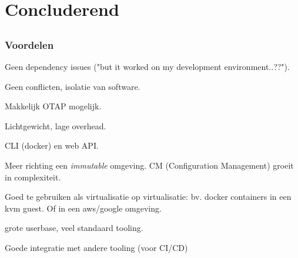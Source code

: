 \section{Concluderend}
\subsection{}
\begin{styleframe}
    \frametitle{Voordelen}
\scriptsize
\begin{description}[plus]
    \item[+] Geen dependency issues ("but it worked on my development environment..??").
    \pause
    \item[+] Geen conflicten, isolatie van software.
    \pause
    \item[+] Makkelijk OTAP mogelijk.
    \pause
    \item[+] Lichtgewicht, lage overhead.
    \pause
    \item[+] CLI (docker) en web API.
    \pause
    \item[+] Meer richting een {\it immutable} omgeving. CM (Configuration Management) groeit in complexiteit.
    \pause
    \item[+] Goed te gebruiken als virtualisatie op virtualisatie: bv. docker containers in een kvm guest. Of in een aws/google omgeving.
    \pause
    \item[+] grote userbase, veel standaard tooling.
    \pause
    \item[+] Goede integratie met andere tooling (voor CI/CD)
    \pause
\end{description}
\end{styleframe}

